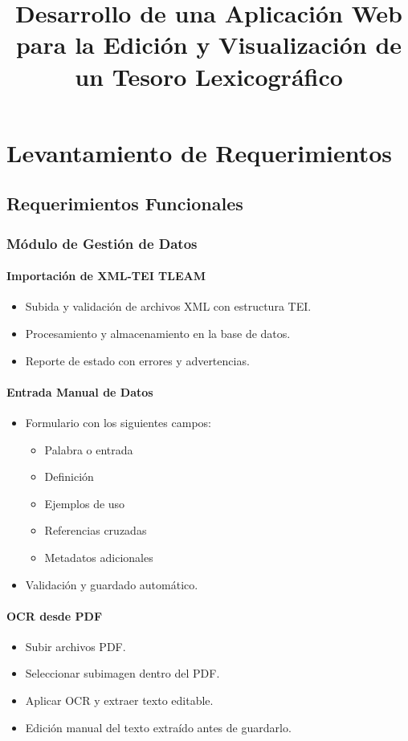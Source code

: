 \documentclass{article}
\title{Desarrollo de una Aplicación Web para la Edición y Visualización de un Tesoro Lexicográfico}
\author{}
\date{}
\begin{document}
\maketitle

\section{Levantamiento de Requerimientos}

\subsection{Requerimientos Funcionales}

\subsubsection{Módulo de Gestión de Datos}

\paragraph{Importación de XML-TEI TLEAM}
\begin{itemize}
    \item Subida y validación de archivos XML con estructura TEI.
    \item Procesamiento y almacenamiento en la base de datos.
    \item Reporte de estado con errores y advertencias.
\end{itemize}

\paragraph{Entrada Manual de Datos}
\begin{itemize}
    \item Formulario con los siguientes campos:
    \begin{itemize}
        \item Palabra o entrada
        \item Definición
        \item Ejemplos de uso
        \item Referencias cruzadas
        \item Metadatos adicionales
    \end{itemize}
    \item Validación y guardado automático.
\end{itemize}

\paragraph{OCR desde PDF}
\begin{itemize}
    \item Subir archivos PDF.
    \item Seleccionar subimagen dentro del PDF.
    \item Aplicar OCR y extraer texto editable.
    \item Edición manual del texto extraído antes de guardarlo.
\end{itemize}
\end{document}
